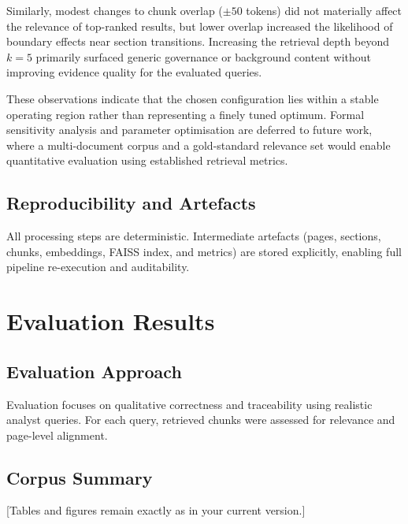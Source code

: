 \documentclass[12pt,a4paper]{report}
\begin{document}
Similarly, modest changes to chunk overlap (\(\pm 50\) tokens) did not materially affect the relevance of top-ranked results, but lower overlap increased the likelihood of boundary effects near section transitions. Increasing the retrieval depth beyond \(k = 5\) primarily surfaced generic governance or background content without improving evidence quality for the evaluated queries.

These observations indicate that the chosen configuration lies within a stable operating region rather than representing a finely tuned optimum. Formal sensitivity analysis and parameter optimisation are deferred to future work, where a multi-document corpus and a gold-standard relevance set would enable quantitative evaluation using established retrieval metrics.

\section{Reproducibility and Artefacts}
All processing steps are deterministic. Intermediate artefacts (pages, sections, chunks, embeddings, FAISS index, and metrics) are stored explicitly, enabling full pipeline re-execution and auditability.

\chapter{Evaluation Results}

\section{Evaluation Approach}
Evaluation focuses on qualitative correctness and traceability using realistic analyst queries. For each query, retrieved chunks were assessed for relevance and page-level alignment.

\section{Corpus Summary}
[Tables and figures remain exactly as in your current version.]
\end{document}
